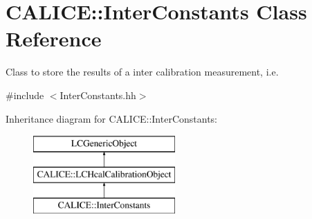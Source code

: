 \section{C\-A\-L\-I\-C\-E\-:\-:Inter\-Constants Class Reference}
\label{classCALICE_1_1InterConstants}


Class to store the results of a inter calibration measurement, i.\-e.  




{\ttfamily \#include $<$Inter\-Constants.\-hh$>$}

Inheritance diagram for C\-A\-L\-I\-C\-E\-:\-:Inter\-Constants\-:\begin{figure}[H]
\begin{center}
\leavevmode
\includegraphics[height=3.000000cm]{classCALICE_1_1InterConstants}
\end{center}
\end{figure}
